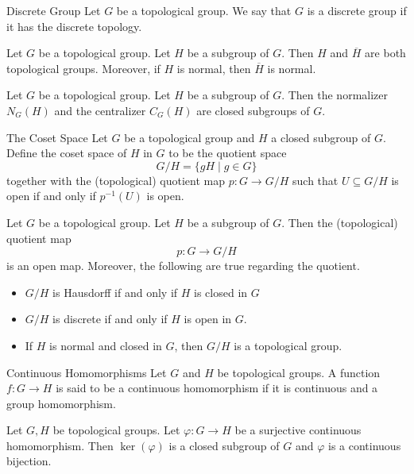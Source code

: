 \documentclass[a4paper]{article}
\begin{document}
\begin{defn}{Discrete Group}{} Let $G$ be a topological group. We say that $G$ is a discrete group if it has the discrete topology. 
\end{defn}

\begin{prp}{}{} Let $G$ be a topological group. Let $H$ be a subgroup of $G$. Then $H$ and $\overline{H}$ are both topological groups. Moreover, if $H$ is normal, then $\overline{H}$ is normal. 
\end{prp}

\begin{prp}{}{} Let $G$ be a topological group. Let $H$ be a subgroup of $G$. Then the normalizer $N_G(H)$ and the centralizer $C_G(H)$ are closed subgroups of $G$. 
\end{prp}

\begin{defn}{The Coset Space}{} Let $G$ be a topological group and $H$ a closed subgroup of $G$. Define the coset space of $H$ in $G$ to be the quotient space $$G/H=\{gH\;|\;g\in G\}$$ together with the (topological) quotient map $p:G\to G/H$ such that $U\subseteq G/H$ is open if and only if $p^{-1}(U)$ is open. 
\end{defn}

\begin{thm}{}{} Let $G$ be a topological group. Let $H$ be a subgroup of $G$. Then the (topological) quotient map $$p:G\to G/H$$ is an open map. Moreover, the following are true regarding the quotient. 
\begin{itemize}
\item $G/H$ is Hausdorff if and only if $H$ is closed in $G$
\item $G/H$ is discrete if and only if $H$ is open in $G$. 
\item If $H$ is normal and closed in $G$, then $G/H$ is a topological group. 
\end{itemize}
\end{thm}

\begin{defn}{Continuous Homomorphisms}{} Let $G$ and $H$ be topological groups. A function $f:G\to H$ is said to be a continuous homomorphism if it is continuous and a group homomorphism. 
\end{defn}

\begin{prp}{}{} Let $G,H$ be topological groups. Let $\varphi:G\to H$ be a surjective continuous homomorphism. Then $\ker(\varphi)$ is a closed subgroup of $G$ and $\varphi$ is a continuous bijection. 
\end{prp}
\end{document}
